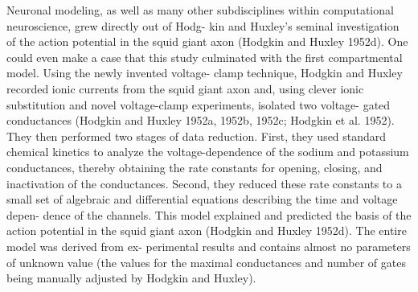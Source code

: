 Neuronal modeling, as well as many other subdisciplines within computational neuroscience, grew directly out of Hodg- kin and Huxley’s seminal investigation of the action potential in the squid giant axon (Hodgkin and Huxley 1952d). One could even make a case that this study culminated with the first compartmental model. Using the newly invented voltage- clamp technique, Hodgkin and Huxley recorded ionic currents from the squid giant axon and, using clever ionic substitution and novel voltage-clamp experiments, isolated two voltage- gated conductances (Hodgkin and Huxley 1952a, 1952b, 1952c; Hodgkin et al. 1952). They then performed two stages of data reduction. First, they used standard chemical kinetics to analyze the voltage-dependence of the sodium and potassium conductances, thereby obtaining the rate constants for opening, closing, and inactivation of the conductances. Second, they reduced these rate constants to a small set of algebraic and differential equations describing the time and voltage depen- dence of the channels. This model explained and predicted the basis of the action potential in the squid giant axon (Hodgkin and Huxley 1952d). The entire model was derived from ex- perimental results and contains almost no parameters of unknown value (the values for the maximal conductances and number of gates being manually adjusted by Hodgkin and Huxley).




